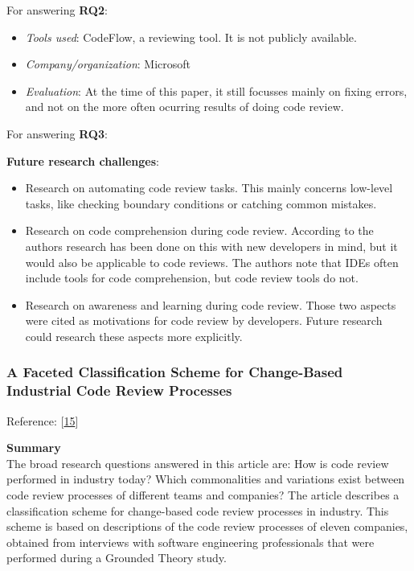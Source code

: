 \documentclass[]{book}
\providecommand{\tightlist}{%
  \setlength{\itemsep}{0pt}\setlength{\parskip}{0pt}}
\begin{document}
For answering \textbf{RQ2}:

\begin{itemize}
\tightlist
\item
  \emph{Tools used}: CodeFlow, a reviewing tool. It is not publicly
  available.
\item
  \emph{Company/organization}: Microsoft
\item
  \emph{Evaluation}: At the time of this paper, it still focusses mainly
  on fixing errors, and not on the more often ocurring results of doing
  code review.
\end{itemize}

For answering \textbf{RQ3}:

\textbf{Future research challenges}:

\begin{itemize}
\tightlist
\item
  Research on automating code review tasks. This mainly concerns
  low-level tasks, like checking boundary conditions or catching common
  mistakes.
\item
  Research on code comprehension during code review. According to the
  authors research has been done on this with new developers in mind,
  but it would also be applicable to code reviews. The authors note that
  IDEs often include tools for code comprehension, but code review tools
  do not.
\item
  Research on awareness and learning during code review. Those two
  aspects were cited as motivations for code review by developers.
  Future research could research these aspects more explicitly.
\end{itemize}

\subsubsection{A Faceted Classification Scheme for Change-Based
Industrial Code Review
Processes}\label{a-faceted-classification-scheme-for-change-based-industrial-code-review-processes}

Reference: {[}\protect\hyperlink{ref-baum2016faceted}{15}{]}

\textbf{Summary}\\
The broad research questions answered in this article are: How is code
review performed in industry today? Which commonalities and variations
exist between code review processes of different teams and companies?
The article describes a classification scheme for change-based code
review processes in industry. This scheme is based on descriptions of
the code review processes of eleven companies, obtained from interviews
with software engineering professionals that were performed during a
Grounded Theory study.
\end{document}
